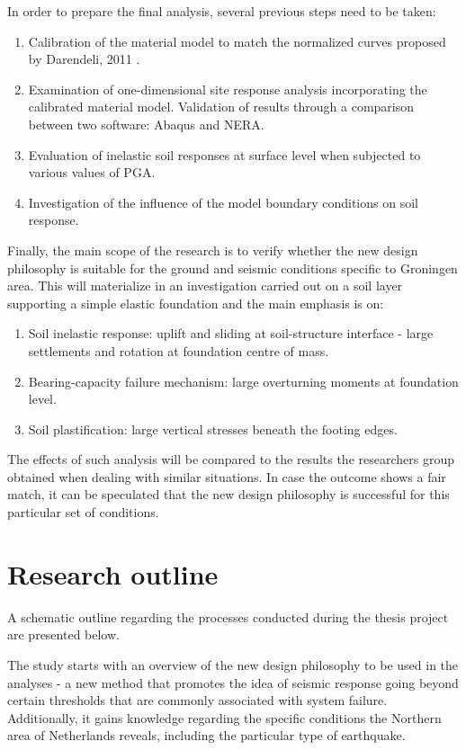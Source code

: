\documentclass[12pt,a4paper]{report}
\begin{document}
In order to prepare the final analysis, several previous steps need to be taken:
\begin{enumerate}
	\item Calibration of the material model to match the normalized curves proposed by Darendeli, 2011 \cite{darendeli2001development}.
	\item Examination of one-dimensional site response analysis incorporating the calibrated material model. Validation of results through a comparison between two software: Abaqus and NERA.
	\item Evaluation of inelastic soil responses at surface level when subjected to various values of PGA.
	\item Investigation of the influence of the model boundary conditions on soil response.
\end{enumerate}

Finally, the main scope of the research is to verify whether the new design philosophy is suitable for the ground and seismic conditions specific to Groningen area. This will materialize in an investigation carried out on a soil layer supporting a simple elastic foundation and the main emphasis is on:

\begin{enumerate}
	\item Soil inelastic response: uplift and sliding at soil-structure interface - large settlements and rotation at foundation centre of mass. 
	\item Bearing-capacity failure mechanism: large overturning moments at foundation level.
	\item Soil plastification: large vertical stresses beneath the footing edges.
\end{enumerate}

The effects of such analysis will be compared to the results the researchers group obtained when dealing with similar situations. In case the outcome shows a fair match, it can be speculated that the new design philosophy is successful for this particular set of conditions.

\section{Research outline}
A schematic outline regarding the processes conducted during the thesis project are presented below. 

The study starts with an overview of the new design philosophy to be used in the analyses - a new method that promotes the idea of seismic response going beyond certain thresholds that are commonly associated with system failure. Additionally, it gains knowledge regarding the specific conditions the Northern area of Netherlands reveals, including the particular type of earthquake.
\end{document}

